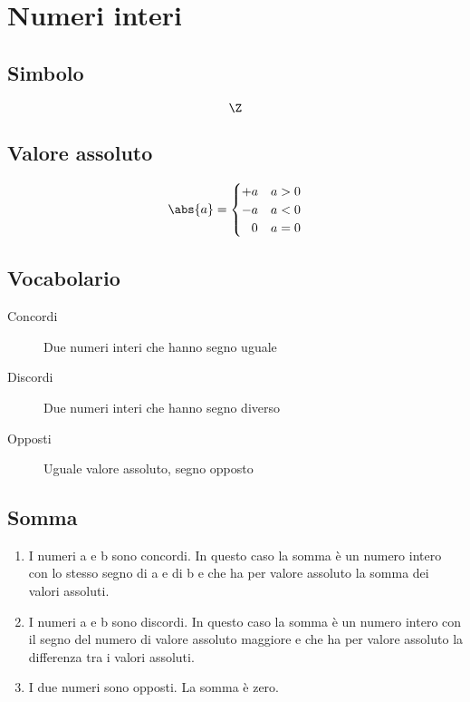 \chapter{Numeri interi}
\section{Simbolo}
\begin{equation}
\Z
\end{equation}
\section{Valore assoluto}
\begin{equation}
\abs{a}=\begin{cases}
	+a&a>0\\
	-a&a<0\\
	\phantom{+}0&a=0
\end{cases}
\end{equation}
\section{Vocabolario}
\begin{description}
	\item[Concordi] Due numeri interi che hanno segno uguale
	\item[Discordi] Due numeri interi che hanno segno diverso
	\item[Opposti] Uguale valore assoluto, segno opposto
\end{description}
\section{Somma}
\begin{enumerate}
	\item I numeri a e b sono concordi. In questo caso la somma è un numero intero con lo stesso segno di a e di b e che ha per valore assoluto la somma dei valori assoluti.
	\item I numeri a e b sono discordi. In questo caso la somma è un numero intero con il segno del numero di valore assoluto maggiore e che ha per valore assoluto la differenza tra i valori assoluti.
	\item I due numeri sono opposti. La somma è zero.
\end{enumerate}
